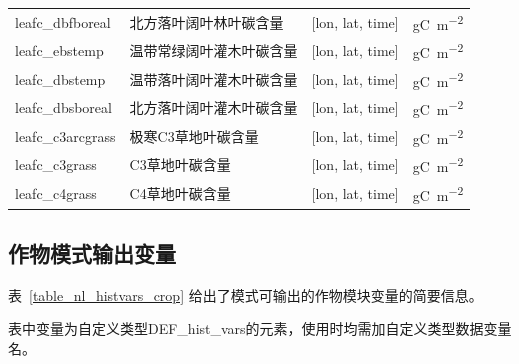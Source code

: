 \documentclass[a4paper,12pt,twoside]{article}
\begin{document}
{\begin{longtable}[htbp]{lp{}ll}
leafc\_dbfboreal & 北方落叶阔叶林叶碳含量 & {[}lon, lat, time{]} & \unit{gC.m^{-2}} \\
leafc\_ebstemp & 温带常绿阔叶灌木叶碳含量 & {[}lon, lat, time{]} & \unit{gC.m^{-2}} \\
leafc\_dbstemp & 温带落叶阔叶灌木叶碳含量 & {[}lon, lat, time{]} & \unit{gC.m^{-2}} \\
leafc\_dbsboreal & 北方落叶阔叶灌木叶碳含量 & {[}lon, lat, time{]} & \unit{gC.m^{-2}} \\
leafc\_c3arcgrass & 极寒C3草地叶碳含量 & {[}lon, lat, time{]} & \unit{gC.m^{-2}} \\
leafc\_c3grass & C3草地叶碳含量 & {[}lon, lat, time{]} & \unit{gC.m^{-2}} \\
leafc\_c4grass & C4草地叶碳含量 & {[}lon, lat, time{]} & \unit{gC.m^{-2}} \\
\end{longtable}}

\subsection{作物模式输出变量}\label{sec_hist_vars_crop}

表~\ref{table_nl_histvars_crop} 给出了模式可输出的作物模块变量的简要信息。\par
表中变量为自定义类型DEF\_hist\_vars的元素，使用时均需加自定义类型数据变量名。
\end{document}
